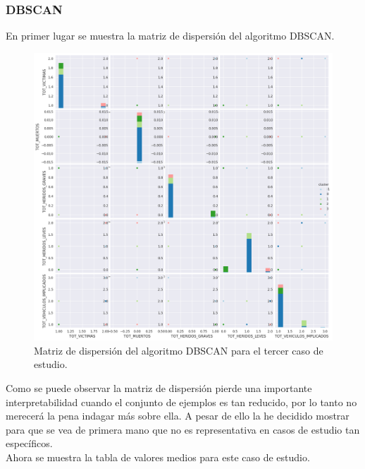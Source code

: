 	\subsubsection{DBSCAN}
	
	En primer lugar se muestra la matriz de dispersión del algoritmo DBSCAN.
	
	\begin{figure}[H]
		\centering
		\includegraphics[scale=0.5]{plots/DBSCAN-WetOverturnedAccidents-ScatterMatrix.png}
		\caption{Matriz de dispersión del algoritmo DBSCAN para el tercer caso de estudio.}
	\end{figure}

	Como se puede observar la matriz de dispersión pierde una importante interpretabilidad cuando el conjunto de ejemplos es tan reducido, por lo tanto no merecerá la pena indagar más sobre ella. A pesar de ello la he decidido mostrar para que se vea de primera mano que no es representativa en casos de estudio tan específicos.\\
	
	Ahora se muestra la tabla de valores medios para este caso de estudio.
	
